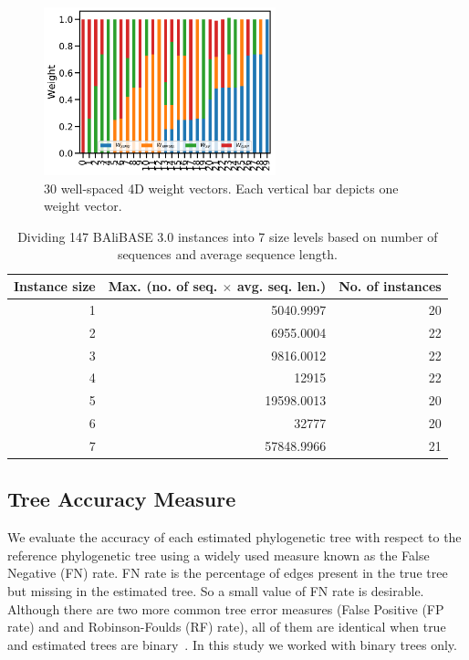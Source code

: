 \begin{figure}[!htbp]%
	\centering
	\includegraphics[width=0.6\textwidth]{Figure/30-4D-weight}
	\caption{30 well-spaced 4D weight vectors. Each vertical bar depicts one weight vector.}
	\label{fig:30-weights}
\end{figure}

\begin{table}[htbp]
	\centering
	\caption{Dividing 147 BAliBASE 3.0 instances into 7 size levels based on number of sequences and average sequence length.}
	\begin{tabular}{r|r|r}
		\multicolumn{1}{l|}{Instance size} & \multicolumn{1}{l|}{Max. (no. of seq. $\times$ avg. seq. len.)} & No. of instances\\
		\hline
		1     & 5040.9997 & 20 \\
		\hline
		2     & 6955.0004 & 22 \\
		\hline
		3     & 9816.0012 & 22 \\
		\hline
		4     & 12915 & 22 \\
		\hline
		5     & 19598.0013 & 20 \\
		\hline
		6     & 32777 & 20 \\
		\hline
		7     & 57848.9966 & 21\\
		\hline
	\end{tabular}%
	\label{tab:data-size}%
\end{table}%


\subsection{Tree Accuracy Measure} 
We evaluate the accuracy of each estimated phylogenetic tree with respect to the reference phylogenetic tree using a widely used measure known as the False Negative (FN) rate. FN rate is the percentage of edges present in the true tree but missing in the estimated tree. So a small value of FN rate is desirable. Although there are two more common tree error measures (False Positive (FP rate) and and Robinson-Foulds (RF) rate), all of them are identical when true and estimated trees are binary~\citep{warnow2017computational}. In this study we worked with binary trees only. %


